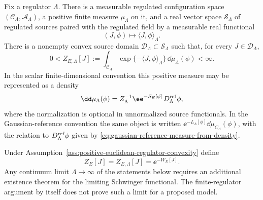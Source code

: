 \begin{assumption}
\label{ass:positive-euclidean-regulator-convexity}
Fix a regulator \(\Lambda\).  There is a measurable regulated configuration
space \((\mathcal C_\Lambda,\mathcal A_\Lambda)\), a positive finite measure
\(\mu_\Lambda\) on it, and a real vector space \(\mathcal S_\Lambda\) of
regulated sources paired with the regulated field by a measurable real
functional
\[
  (J,\phi)\longmapsto \langle J,\phi\rangle_\Lambda .
\]
There is a nonempty convex source domain
\(\mathcal D_\Lambda\subset\mathcal S_\Lambda\) such that, for every
\(J\in\mathcal D_\Lambda\),
\begin{equation}
  0<
  Z_{E,\Lambda}[J]
  :=
  \int_{\mathcal C_\Lambda}
  \exp\{-\langle J,\phi\rangle_\Lambda\}\,
  \dd\mu_\Lambda(\phi)
  <\infty .
  \label{eq:positive-regulator-partition-function}
\end{equation}
In the scalar finite-dimensional convention this positive measure may be
represented as a density
\[
  \dd\mu_\Lambda(\phi)
  =
  Z_\Lambda^{-1}
  \ee^{-S_E[\phi]}\,
  D_\Lambda^{\rm ref}\phi ,
\]
where the normalization is optional in unnormalized source functionals.  In the
Gaussian-reference convention the same object is written
\(\ee^{-L_\Lambda[\phi]}\dd\mu_{C_\Lambda}(\phi)\), with the relation to
\(D_\Lambda^{\rm ref}\phi\) given by
\eqref{eq:gaussian-reference-measure-from-density}.
\end{assumption}

Under Assumption~\ref{ass:positive-euclidean-regulator-convexity} define
\[
  Z_E[J]=Z_{E,\Lambda}[J]=\ee^{-W_E[J]} .
\]
Any continuum limit \(\Lambda\to\infty\) of the statements below requires an
additional existence theorem for the limiting Schwinger functional.  The
finite-regulator argument by itself does not prove such a limit for a proposed
model.

